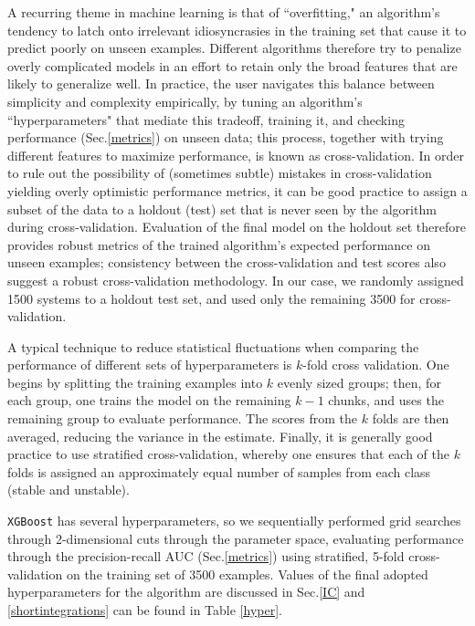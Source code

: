 A recurring theme in machine learning is that of ``overfitting," an algorithm's tendency to latch onto irrelevant idiosyncrasies in the training set that cause it to predict poorly on unseen examples.
Different algorithms therefore try to penalize overly complicated models in an effort to retain only the broad features that are likely to generalize well.
In practice, the user navigates this balance between simplicity and complexity empirically, by tuning an algorithm's ``hyperparameters" that mediate this tradeoff, training it, and checking performance (Sec.\:\ref{metrics}) on unseen data; this process, together with trying different features to maximize performance, is known as cross-validation. 
In order to rule out the possibility of (sometimes subtle) mistakes in cross-validation yielding overly optimistic performance metrics, it can be good practice to assign a subset of the data to a holdout (test) set that is never seen by the algorithm during cross-validation.
Evaluation of the final model on the holdout set therefore provides robust metrics of the trained algorithm's expected performance on unseen examples; consistency between the cross-validation and test scores also suggest a robust cross-validation methodology.
In our case, we randomly assigned 1500 systems to a holdout test set, and used only the remaining 3500 for cross-validation.

A typical technique to reduce statistical fluctuations when comparing the performance of different sets of hyperparameters is $k$-fold cross validation.
One begins by splitting the training examples into $k$ evenly sized groups; then, for each group, one trains the model on the remaining $k-1$ chunks, and uses the remaining group to evaluate performance.
The scores from the $k$ folds are then averaged, reducing the variance in the estimate.
Finally, it is generally good practice to use stratified cross-validation, whereby one ensures that each of the $k$ folds is assigned an approximately equal number of samples from each class (stable and unstable).

{\tt XGBoost} has several hyperparameters, so we sequentially performed grid searches through 2-dimensional cuts through the parameter space, evaluating performance through the precision-recall AUC (Sec.\:\ref{metrics}) using stratified, 5-fold cross-validation on the training set of 3500 examples.
Values of the final adopted hyperparameters for the algorithm are discussed in Sec.\:\ref{IC} and \ref{shortintegrations} can be found in Table \ref{hyper}.

